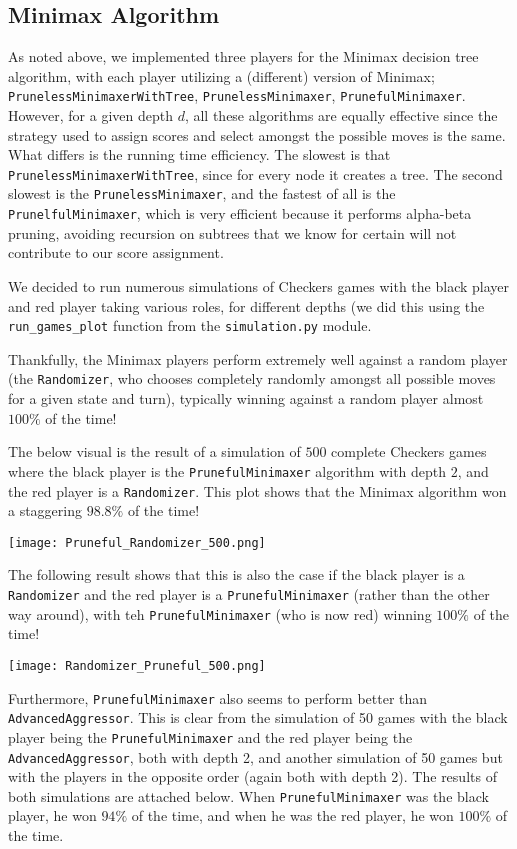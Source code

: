 \documentclass[fontsize=11pt]{article}
\begin{document}
\subsection*{Minimax Algorithm}
As noted above, we implemented three players for the Minimax decision tree algorithm, with each player utilizing a (different) version of Minimax; \texttt{PrunelessMinimaxerWithTree}, \texttt{PrunelessMinimaxer}, \texttt{PrunefulMinimaxer}. However, for a given depth $d$, all these algorithms are equally effective since the strategy used to assign scores and select amongst the possible moves is the same. What differs is the running time efficiency. The slowest is that \texttt{PrunelessMinimaxerWithTree}, since for every node it creates a tree. The second slowest is the \texttt{PrunelessMinimaxer}, and the fastest of all is the \texttt{PrunelfulMinimaxer}, which is very efficient because it performs alpha-beta pruning, avoiding recursion on subtrees that we know for certain will not contribute to our score assignment.

We decided to run numerous simulations of Checkers games with the black player and red player taking various roles, for different depths (we did this using the \texttt{run\_games\_plot} function from the \texttt{simulation.py} module.

Thankfully, the Minimax players perform extremely well against a random player (the \texttt{Randomizer}, who chooses completely randomly amongst all possible moves for a given state and turn), typically winning against a random player almost $100\%$ of the time! 

The below visual is the result of a simulation of $500$ complete Checkers games where the black player is the \texttt{PrunefulMinimaxer} algorithm with depth $2$, and the red player is a \texttt{Randomizer}. This plot shows that the Minimax algorithm won a staggering $98.8\%$ of the time!


\texttt{[image: Pruneful\_Randomizer\_500.png]}

The following result shows that this is also the case if the black player is a \texttt{Randomizer} and the red player is a \texttt{PrunefulMinimaxer} (rather than the other way around), with teh \texttt{PrunefulMinimaxer} (who is now red) winning $100\%$ of the time!

\texttt{[image: Randomizer\_Pruneful\_500.png]}

Furthermore, \texttt{PrunefulMinimaxer} also seems to perform better than \texttt{AdvancedAggressor}. This is clear from the simulation of 50 games with the black player being the \texttt{PrunefulMinimaxer} and the red player being the \texttt{AdvancedAggressor}, both with depth 2, and another simulation of 50 games but with the players in the opposite order (again both with depth 2). The results of both simulations are attached below. When \texttt{PrunefulMinimaxer} was the black player, he won $94\%$ of the time, and when he was the red player, he won $100\%$ of the time.
\end{document}
